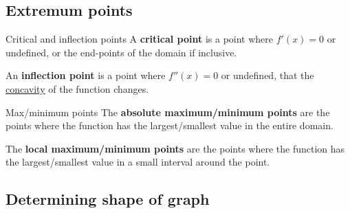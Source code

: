 \documentclass{article}
\begin{document}
\subsection{Extremum points}
\begin{definition}
    {Critical and inflection points}
    A \textbf{critical point} is a point where $f'(x)=0$ or undefined, or the end-points of the domain if inclusive.

    An \textbf{inflection point} is a point where $f''(x)=0$ or undefined, that the \hyperref[sec:concavity]{concavity} of the function changes.
\end{definition}
\begin{definition}
    {Max/minimum points}
    The \textbf{absolute maximum/minimum points} are the points where the function has the largest/smallest value in the entire domain.

    The \textbf{local maximum/minimum points} are the points where the function has the largest/smallest value in a small interval around the point.
\end{definition}

\subsection{Determining shape of graph}
\end{document}
